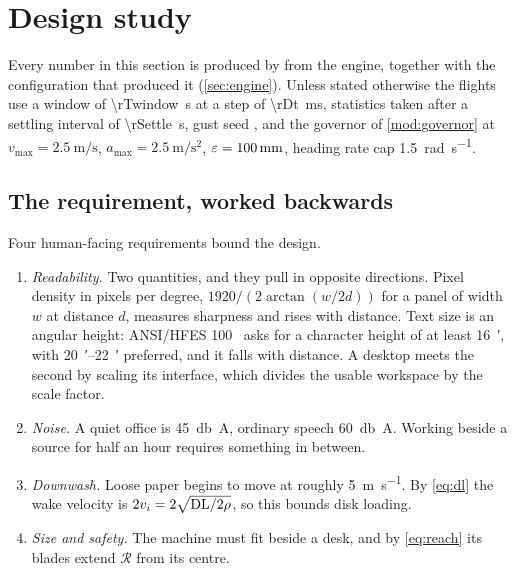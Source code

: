 ﻿\section{Design study}
\label{sec:results}

Every number in this section is produced by 
from the engine, together with the configuration that produced it
(\cref{sec:engine}). Unless stated otherwise the flights use a window of
\SI{\rTwindow}{\second} at a step of \SI{\rDt}{\milli\second}, statistics
taken after a settling interval of \SI{\rSettle}{\second}, gust seed
\rSeed, and the governor of \cref{mod:governor} at
$v_{\max}=\SI{2.5}{\metre\per\second}$,
$a_{\max}=\SI{2.5}{\metre\per\second\squared}$,
$\varepsilon=\SI{100}{\milli\metre}$, heading rate cap
\SI{1.5}{\radian\per\second}.

\subsection{The requirement, worked backwards}

Four human-facing requirements bound the design.

\begin{enumerate}[label=(R\arabic*),nosep]
  \item \emph{Readability.} Two quantities, and they pull in opposite
        directions. Pixel density in pixels per degree,
        $1920/(2\arctan(w/2d))$ for a panel of width $w$ at distance $d$,
        measures sharpness and rises with distance. Text size is an angular
        height: ANSI/HFES 100~\cite{hfes2007} asks for a character height of
        at least \SI{16}{\arcminute}, with \SIrange{20}{22}{\arcminute}
        preferred, and it falls with distance. A desktop meets the second by
        scaling its interface, which divides the usable workspace by the
        scale factor.
  \item \emph{Noise.} A quiet office is \SI{45}{\decibel A}, ordinary speech
        \SI{60}{\decibel A}. Working beside a source for half an hour requires
        something in between.
  \item \emph{Downwash.} Loose paper begins to move at roughly
        \SI{5}{\metre\per\second}. By \cref{eq:dl} the wake velocity is
        $2v_i = 2\sqrt{\mathrm{DL}/2\rho}$, so this bounds disk loading.
  \item \emph{Size and safety.} The machine must fit beside a desk, and by
        \cref{eq:reach} its blades extend $\mathcal{R}$ from its centre.
\end{enumerate}

